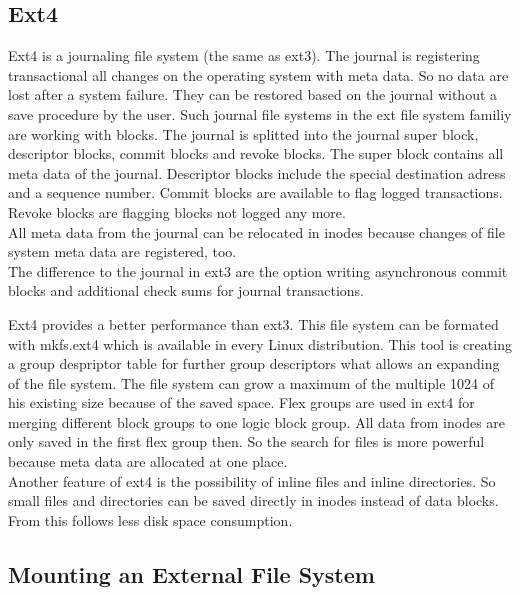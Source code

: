 \subsection{Ext4}

Ext4 is a journaling file system (the same as ext3). The journal is registering transactional all changes on the operating system with meta data.
So no data  are lost after a system failure. They can be restored based on the journal without a save procedure by the user.
Such journal file systems in the ext file system familiy are working with blocks\cite[~p.20]{Seufert2015}.
The journal is splitted into the journal super block, descriptor blocks, commit blocks and revoke blocks.
The super block contains all meta data of the journal. Descriptor blocks include the special destination adress and a sequence number. 
Commit blocks are available to flag logged transactions.
Revoke blocks are flagging blocks not logged any more. \\
All meta data from the journal can be relocated in inodes because changes of file system meta data are registered, too. \\
The difference to the journal in ext3 are the option writing asynchronous commit blocks and additional check sums for journal transactions\cite[~p.28]{Seufert2015}.

Ext4 provides a better performance than ext3. 
This file system can be formated with mkfs.ext4 which is available in every Linux distribution.
This tool is creating a group despriptor table for further group descriptors what allows an expanding of the file system. The file system can grow a maximum of the multiple 1024 of his existing size because of the saved space\cite[~p.21]{Seufert2015}.
Flex groups are used in ext4 for merging different block groups to one logic block group. All data from inodes are only saved in the first flex group then. 
So the search for files is more powerful because meta data are allocated at one place. \\

Another feature of ext4 is the possibility of inline files and inline directories. So small files and directories can be saved directly in inodes instead of data blocks. From this follows less disk space consumption\cite[p.24]{Seufert2015}.

\subsection{Mounting an External File System}

